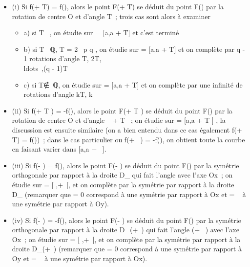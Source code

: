 \documentclass[]{article}
\begin{document}
\begin{itemize}
\itemsep1pt\parskip0pt
\item
  (i) Si f(\theta + T) = f(\theta), alors le point F(\theta + T) se déduit du point
  F(\theta) par la rotation de centre O et d'angle T~; trois cas sont alors à
  examiner

  \begin{itemize}
  \itemsep1pt\parskip0pt
  \item
    a) si T \pi~, on étudie sur \Delta = [a,a + T] \bigcapD et c'est terminé
  \item
    b) si T \in \pi~ℚ, T = 2\pi~ p \over q , on étudie sur \Delta
    = [a,a + T] \bigcapD et on complète par q - 1 rotations d'angle T,
    2T,\\ldots~,(q -
    1)T
  \item
    c) si T∉\pi~ℚ, on étudie sur \Delta = [a,a +
    T] \bigcapD et on complète par une infinité de rotations d'angle kT, k \in
  \end{itemize}
\item
  (ii) Si f(\theta + T  ) = -f(\theta), alors le point
  F(\theta + T  ) se déduit du point F(\theta) par la
  rotation de centre O et d'angle \pi~ + T  ~; on
  étudie sur \Delta = [a,a + T  ] \bigcapD, la
  discussion est ensuite similaire (on a bien entendu dans ce cas
  également f(\theta + T) = f(\theta))~; dans le cas particulier ou f(\theta + \pi~) =
  -f(\theta), on obtient toute la courbe en faisant varier \theta dans [a,a +
  \pi~].
\item
  (iii) Si f(\omega - \theta) = f(\theta), alors le point F(\omega - \theta) se déduit du point
  F(\theta) par la symétrie orthogonale par rapport à la droite
  D_\omega{} qui fait l'angle \omega{} avec l'axe Ox~; on étudie sur \Delta =
  [ \omega {} ,+\infty~[\bigcapD, et on complète par la
  symétrie par rapport à la droite D_\omega{} (remarquer que \omega = 0
  correspond à une symétrie par rapport à Ox et \omega = \pi~ à une symétrie par
  rapport à Oy).
\item
  (iv) Si f(\omega - \theta) = -f(\theta), alors le point F(\omega - \theta) se déduit du point
  F(\theta) par la symétrie orthogonale par rapport à la droite
  D_(\omega+\pi~) qui fait l'angle (\omega + \pi~) avec l'axe Ox~; on
  étudie sur \Delta = [ \omega {} ,+\infty~[\bigcapD, et on
  complète par la symétrie par rapport à la droite D_(\omega+\pi~)
  (remarquer que \omega = 0 correspond à une symétrie par rapport à Oy et \omega =
  \pi~ à une symétrie par rapport à Ox).
\end{itemize}
\end{document}
